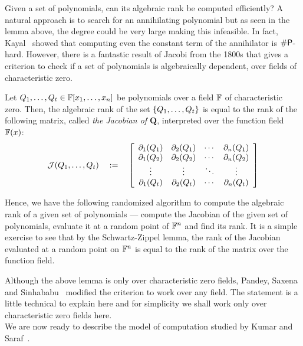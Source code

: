 Given a set of polynomials, can its algebraic rank be computed efficiently? A natural approach is to search for an annihilating polynomial but as seen in the lemma above, the degree could be very large making this infeasible. In fact, Kayal~\cite{Kayal09} showed that computing even the constant term of the annihilator is $\#\P$-hard. However, there is a fantastic result of Jacobi from the 1800s that gives a criterion to check if a set of polynomials is algebraically dependent, over fields of characteristic zero. 

\begin{lemma}\label{lem:jacobian-criterion}
Let $Q_1,\ldots, Q_t \in \F[x_1,\ldots, x_n]$ be polynomials over a field $\F$ of characteristic zero. Then, the algebraic rank of the set $\set{Q_1,\ldots, Q_t}$ is equal to the rank of the following matrix, called \emph{the Jacobian of $\mathbf{Q}$}, interpreted over the function field $\F(x)$:
\[
\mathcal{J}(Q_1,\ldots, Q_t) \spaced{:=} \insquare{\begin{array}{cccc}
\partial_1(Q_1) & \partial_2(Q_1) & \cdots & \partial_n(Q_1)\\
\partial_1(Q_2) & \partial_2(Q_2) & \cdots & \partial_n(Q_2)\\
\vdots & \vdots & \ddots & \vdots\\
\partial_1(Q_t) & \partial_2(Q_t) & \cdots & \partial_n(Q_t)
                                          \end{array}}                                          
\]
\end{lemma}

Hence, we have the following randomized algorithm to compute the algebraic rank of a given set of polynomials --- compute the Jacobian of the given set of polynomials, evaluate it at a random point of $\F^n$ and find its rank.
It is a simple exercise to see that by the Schwartz-Zippel lemma, the rank of the Jacobian evaluated at a random point on $\F^n$ is equal to the rank of the matrix over the function field.

Although the above lemma is only over characteristic zero fields, Pandey, Saxena and Sinhababu~\cite{PSS16} modified the criterion to work over any field. The statement is a little technical to explain here and for simplicity we shall work only over characteristic zero fields here. 
\\

\noindent
We are now ready to describe the model of computation studied by Kumar and Saraf~\cite{KS16lowrank}. 


